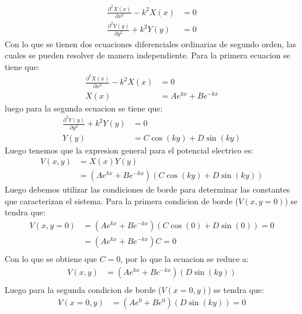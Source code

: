 \documentclass[
  11pt,
  letterpaper,
   addpoints,
   answers
  ]{exam}
\begin{document}
\begin{questions}
\begin{solution}
\begin{enumerate}
            \begin{align}
                \frac{\partial^{2}X(x)}{\partial x^{2}} - k^{2}X(x) &= 0\\
                \frac{\partial^{2}Y(y)}{\partial y^{2}} + k^{2}Y(y) &= 0
            \end{align}
            Con lo que se tienen dos ecuaciones diferenciales ordinarias de segundo orden, las cuales se pueden resolver de manera independiente. Para la primera ecuacion se tiene que:
            \begin{align}
                \frac{\partial^{2}X(x)}{\partial x^{2}} - k^{2}X(x) &= 0\\
                X(x) &= Ae^{kx} + Be^{-kx}
            \end{align}
            luego para la segunda ecuacion se tiene que:
            \begin{align}
                \frac{\partial^{2}Y(y)}{\partial y^{2}} + k^{2}Y(y) &= 0\\
                Y(y) &= C\cos(ky) + D\sin(ky)
            \end{align}
            Luego tenemos que la expresion general para el potencial electrico es:
            \begin{align}
                V(x,y) &= X(x)Y(y)\\
                       &= \left(Ae^{kx} + Be^{-kx}\right)\left(C\cos(ky) + D\sin(ky)\right)
        \end{align}
        Luego debemos utilizar las condiciones de borde para determinar las constantes que caracterizan el sistema. Para la primera condicion de borde ($V(x,y=0)$) se tendra que:
        \begin{align}
            V(x,y=0) &= \left(Ae^{kx} + Be^{-kx}\right)\left(C\cos(0) + D\sin(0)\right) = 0\\
            &= \left(Ae^{kx} + Be^{-kx}\right)C = 0\\
        \end{align}
        Con lo que se obtiene que $C=0$, por lo que la ecuacion se reduce a:
        \begin{align}
            V(x,y) &= \left(Ae^{kx} + Be^{-kx}\right)\left(D\sin(ky)\right)\\
        \end{align}
        Luego para la segunda condicion de borde ($V(x=0,y)$) se tendra que:
        \begin{align}
            V(x=0,y) &= \left(Ae^{0} + Be^{0}\right)\left(D\sin(ky)\right) = 0\\

\end{align}
\end{enumerate}
\end{solution}
\end{questions}
\end{document}
